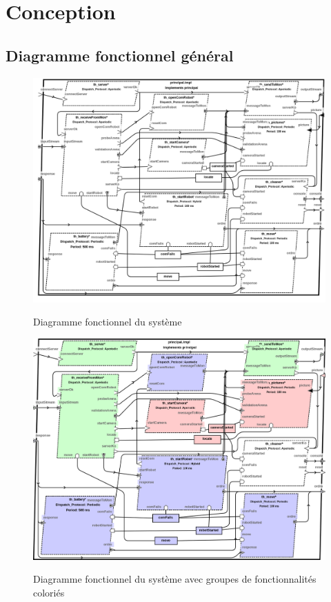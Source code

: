 \documentclass[11pt, a4paper]{paper}
\begin{document}
\section{Conception}

\subsection{Diagramme fonctionnel général}

\begin{figure}[H]
\label{fig:diag_fonc_gen}
\begin{center} 
{\includegraphics[height=0.65\textheight,angle=90]{./figures-pdf/diagramme_aadl_final.png}} 
{\caption{Diagramme fonctionnel du système}}
\end{center}
\end{figure}

\begin{figure}[H]
\label{fig:diag_fonc_gen_blocks}
\begin{center} 
{\includegraphics[height=0.65\textheight,angle=90]{./figures-pdf/diagramme_aadl_final_colorise.png}} 
{\caption{Diagramme fonctionnel du système avec groupes de fonctionnalités coloriés}}
\end{center}
\end{figure}
\end{document}
